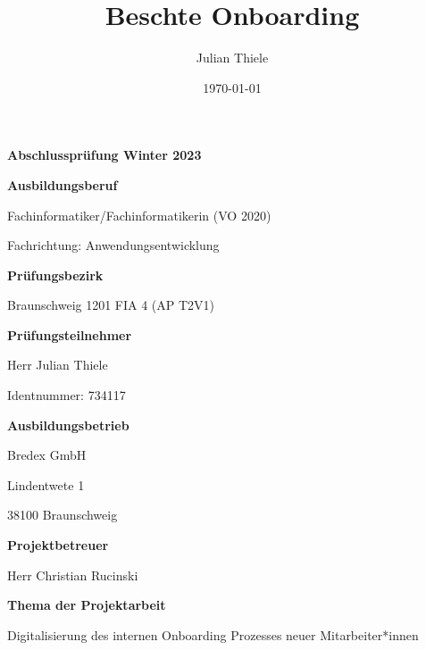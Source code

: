 \documentclass[11pt]{article}
\title{Beschte Onboarding}
\date{\today}
\author{Julian Thiele}
\begin{document}
\sloppy
       
\begin{titlepage}
    \vspace*{\fill}
        \centering
        {\Huge \textbf{Abschlussprüfung Winter 2023}\par}
        \vspace{1cm}
        {\Large \textbf{Ausbildungsberuf}\par}
        {\Large Fachinformatiker/Fachinformatikerin (VO 2020) \par Fachrichtung: Anwendungsentwicklung\par}
        \vspace{1cm}
        {\Large \textbf{Prüfungsbezirk}\par}
        {\Large Braunschweig 1201 FIA 4 (AP T2V1)\par}
        \vspace{1cm}
        {\Large \textbf{Prüfungsteilnehmer}\par}
        {\Large Herr Julian Thiele\par}
        {\Large Identnummer: 734117\par}
        \vspace{1cm}
        {\Large \textbf{Ausbildungsbetrieb}\par}
        {\Large Bredex GmbH\par}
        {\Large Lindentwete 1\par}
        {\Large 38100 Braunschweig\par}
        \vspace{1cm}
        {\Large \textbf{Projektbetreuer}\par}
        {\Large Herr Christian Rucinski\par}
        \vspace{1cm}
        {\Large \textbf{Thema der Projektarbeit}\par}
        {\Large Digitalisierung des internen Onboarding Prozesses neuer Mitarbeiter*innen\par}

    \vspace*{\fill}   
\end{titlepage}


\tableofcontents
{}
\newpage
{}
\pagestyle{fancy}
                    
\end{document}
